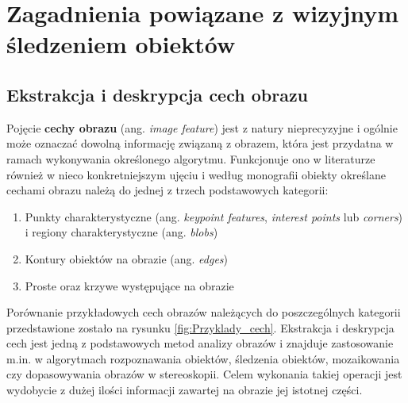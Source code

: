 \chapter{Zagadnienia powiązane z wizyjnym śledzeniem obiektów}
\label{cha:Zagadnienia_powiazane_z_wizyjnym_sledzeniem_obiektow}

\section{Ekstrakcja i deskrypcja cech obrazu}
\label{sec:Ekstrakcja_i_deskrypcja_cech_obrazu}
Pojęcie \textbf{cechy obrazu} (ang. \textit{image feature}) jest z natury nieprecyzyjne i ogólnie może oznaczać dowolną informację związaną z obrazem, która jest przydatna w ramach wykonywania określonego algorytmu. Funkcjonuje ono w literaturze również w nieco konkretniejszym ujęciu i według monografii \cite{Szeliski2011} obiekty określane cechami obrazu należą do jednej z trzech podstawowych kategorii:

\begin{enumerate}
	\item Punkty charakterystyczne (ang. \textit{keypoint features}, \textit{interest points} lub \textit{corners}) i regiony charakterystyczne (ang. \textit{blobs})
	\item Kontury obiektów na obrazie (ang. \textit{edges})
	\item Proste oraz krzywe występujące na obrazie
\end{enumerate}

Porównanie przykładowych cech obrazów należących do poszczególnych kategorii przedstawione zostało na rysunku \ref{fig:Przyklady_cech}. Ekstrakcja i deskrypcja cech jest jedną z podstawowych metod analizy obrazów i znajduje zastosowanie m.in. w algorytmach rozpoznawania obiektów, śledzenia obiektów, mozaikowania czy dopasowywania obrazów w stereoskopii. Celem wykonania takiej operacji jest wydobycie z dużej ilości informacji zawartej na obrazie jej istotnej części.

